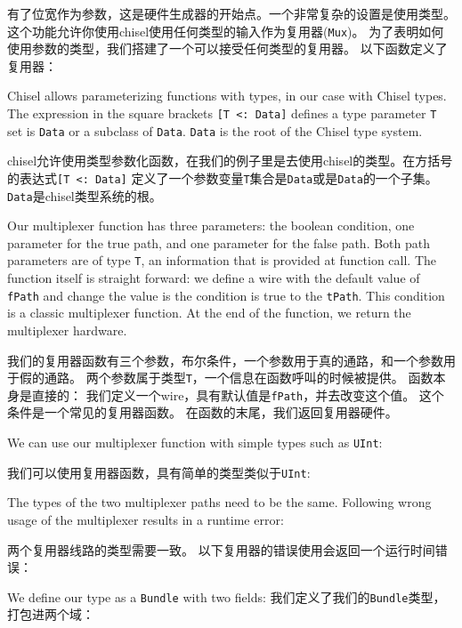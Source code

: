 \documentclass[%
    10pt,
    headinclude, footexclude,
    openright, %
    notitlepage,
    cleardoubleempty,
    headsepline,
    pointlessnumbers,
    bibtotoc, idxtotoc,
    ]{scrbook}
\newcommand{\code}[1]{{\small{\texttt{#1}}}}
\begin{document}
{有了位宽作为参数，这是硬件生成器的开始点。一个非常复杂的设置是使用类型。
这个功能允许你使用chisel使用任何类型的输入作为复用器(\code{Mux})。
为了表明如何使用参数的类型，我们搭建了一个可以接受任何类型的复用器。
以下函数定义了复用器：


Chisel allows parameterizing functions with types, in our case with Chisel
types. The expression in the square brackets \code{[T <: Data]} defines
a type parameter \code{T} set is \code{Data} or a subclass of \code{Data}.
\code{Data} is the root of the Chisel type system.

chisel允许使用类型参数化函数，在我们的例子里是去使用chisel的类型。在方括号的表达式\code{[T <: Data]}
定义了一个参数变量\code{T}集合是\code{Data}或是\code{Data}的一个子集。
\code{Data}是chisel类型系统的根。

Our multiplexer function has three parameters: the boolean condition,
one parameter for the true path, and one parameter for the false path.
Both path parameters are of type \code{T}, an information that is
provided at function call. The function itself is straight forward:
we define a wire with the default value of \code{fPath} and
change the value is the condition is true to the \code{tPath}.
This condition is a classic multiplexer function.
At the end of the function, we return the multiplexer hardware.

我们的复用器函数有三个参数，布尔条件，一个参数用于真的通路，和一个参数用于假的通路。
两个参数属于类型\code{T}，一个信息在函数呼叫的时候被提供。
函数本身是直接的：
我们定义一个wire，具有默认值是\code{fPath}，并去改变这个值。
这个条件是一个常见的复用器函数。
在函数的末尾，我们返回复用器硬件。

We can use our multiplexer function with simple types such as
\code{UInt}:

我们可以使用复用器函数，具有简单的类型类似于\code{UInt}:


\noindent The types of the two multiplexer paths need to be the same.
Following wrong usage of the multiplexer results in a runtime error:

\noindent 两个复用器线路的类型需要一致。
以下复用器的错误使用会返回一个运行时间错误：


\noindent We define our type as a \code{Bundle} with two fields:
\noindent 我们定义了我们的\code{Bundle}类型，打包进两个域：

}
\end{document}
